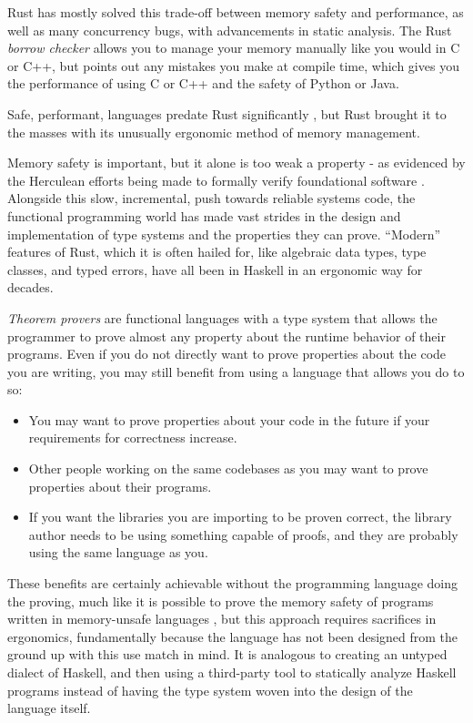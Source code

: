 \documentclass[12pt,twoside]{report}
\begin{document}
Rust \citep{RustProgrammingLanguage2015} has mostly solved this trade-off between memory safety and performance, as well as many concurrency bugs, with advancements in static analysis. The Rust \textit{borrow checker} allows you to manage your memory manually like you would in C or C++, but points out any mistakes you make at compile time, which gives you the performance of using C or C++ and the safety of Python or Java.

Safe, performant, languages predate Rust significantly \citep{morrisettCycloneSafeDialect}, but Rust brought it to the masses with its unusually ergonomic method of memory management. 

Memory safety is important, but it alone is too weak a property - as evidenced by the Herculean efforts being made to formally verify foundational software \citep{kleinSeL4FormalVerification2009a, lorch2020armada, ferraiuolo2017komodo, bhargavan2017everest}. Alongside this slow, incremental, push towards reliable systems code, the functional programming world has made vast strides in the design and implementation of type systems and the properties they can prove. ``Modern'' features of Rust, which it is often hailed for, like algebraic data types, type classes, and typed errors, have all been in Haskell in an ergonomic way for decades.

\textit{Theorem provers} are functional languages with a type system that allows the programmer to prove almost \citep{kurtgodelUberFormalUnentscheidbare1931} any property about the runtime behavior of their programs. Even if you do not directly want to prove properties about the code you are writing, you may still benefit from using a language that allows you do to so:
\begin{itemize}
  \itemsep0em 
  \item You may want to prove properties about your code in the future if your requirements for correctness increase.
  \item Other people working on the same codebases as you may want to prove properties about their programs.
  \item If you want the libraries you are importing to be proven correct, the library author needs to be using something capable of proofs, and they are probably using the same language as you.
\end{itemize}

These benefits are certainly achievable without the programming language doing the proving, much like it is possible to prove the memory safety of programs written in memory-unsafe languages \citep{kleinSeL4FormalVerification2009a}, but this approach requires sacrifices in ergonomics, fundamentally because the language has not been designed from the ground up with this use match in mind. It is analogous to creating an untyped dialect of Haskell, and then using a third-party tool to statically analyze Haskell programs instead of having the type system woven into the design of the language itself.
\end{document}
